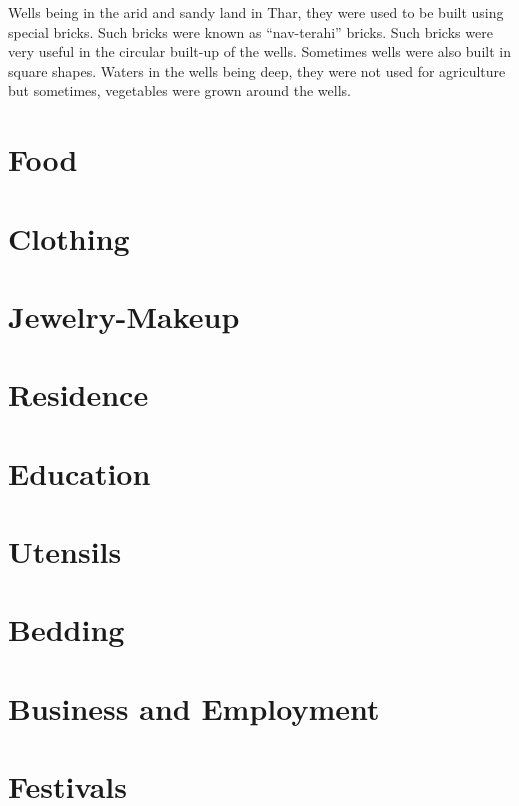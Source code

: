 Wells being in the arid and sandy land in Thar, they were used to be built using special bricks. Such bricks were known as ``nav-terahi'' bricks. Such bricks were very useful in the circular built-up of the wells. Sometimes wells were also built in square shapes. Waters in the wells being deep, they were not used for agriculture but sometimes, vegetables were grown around the wells. 
\section{Food}
\section{Clothing}
\section{Jewelry-Makeup}
\section{Residence}
\section{Education}
\section{Utensils}
\section{Bedding}
\section{Business and Employment}
\section{Festivals}
